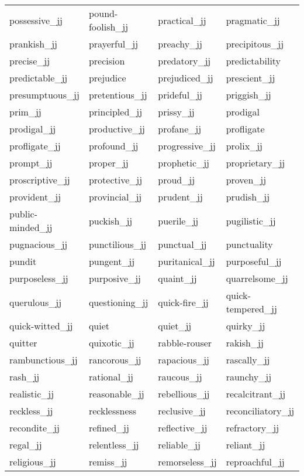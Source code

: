 \begin{longtable}[!htbp]{| llll |}
   possessive\_jj & pound-foolish\_jj & practical\_jj & pragmatic\_jj \\
   prankish\_jj & prayerful\_jj & preachy\_jj & precipitous\_jj \\
   precise\_jj & precision & predatory\_jj & predictability \\
   predictable\_jj & prejudice & prejudiced\_jj & prescient\_jj \\
   presumptuous\_jj & pretentious\_jj & prideful\_jj & priggish\_jj \\
   prim\_jj & principled\_jj & prissy\_jj & prodigal \\
   prodigal\_jj & productive\_jj & profane\_jj & profligate \\
   profligate\_jj & profound\_jj & progressive\_jj & prolix\_jj \\
   prompt\_jj & proper\_jj & prophetic\_jj & proprietary\_jj \\
   proscriptive\_jj & protective\_jj & proud\_jj & proven\_jj \\
   provident\_jj & provincial\_jj & prudent\_jj & prudish\_jj \\
   public-minded\_jj & puckish\_jj & puerile\_jj & pugilistic\_jj \\
   pugnacious\_jj & punctilious\_jj & punctual\_jj & punctuality \\
   pundit & pungent\_jj & puritanical\_jj & purposeful\_jj \\
   purposeless\_jj & purposive\_jj & quaint\_jj & quarrelsome\_jj \\
   querulous\_jj & questioning\_jj & quick-fire\_jj & quick-tempered\_jj \\
   quick-witted\_jj & quiet & quiet\_jj & quirky\_jj \\
   quitter & quixotic\_jj & rabble-rouser & rakish\_jj \\
   rambunctious\_jj & rancorous\_jj & rapacious\_jj & rascally\_jj \\
   rash\_jj & rational\_jj & raucous\_jj & raunchy\_jj \\
   realistic\_jj & reasonable\_jj & rebellious\_jj & recalcitrant\_jj \\
   reckless\_jj & recklessness & reclusive\_jj & reconciliatory\_jj \\
   recondite\_jj & refined\_jj & reflective\_jj & refractory\_jj \\
   regal\_jj & relentless\_jj & reliable\_jj & reliant\_jj \\
   religious\_jj & remiss\_jj & remorseless\_jj & reproachful\_jj \\

\end{longtable}
